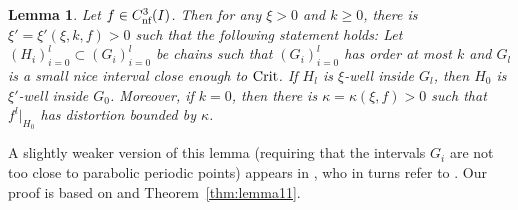 \documentclass[12pt, psamsfonts, reqno]{amsart}
\newtheorem{lemma}[theorem]{Lemma}
\begin{document}
\begin{lemma} \label{lem:boundedorder}
 Let $f\in {C^3_{\text{\rm nf}}}(I)$. Then for any $\xi>0$
 and $k\geq 0$, there is $\xi'=\xi'(\xi,k,f)>0$  such that the following statement
 holds: Let $(H_i)_{i=0}^l\subset
 (G_i)_{i=0}^l$ be chains such that $(G_i)_{i=0}^l$ has order at most $k$ and $G_l$
 is a small nice interval close enough to ${\mathop{\rm Crit}\nolimits}$. If $H_l$ is $\xi$-well inside
 $G_l$, then $H_0$ is $\xi'$-well inside $G_0$. Moreover, if $k=0$, then there
 is $\kappa = \kappa(\xi, f)>0$ such that $f^l|_{H_0}$ has distortion bounded
 by $\kappa$.
\end{lemma}

A slightly weaker version of this lemma (requiring that the
intervals $G_i$ are not too close to parabolic periodic points)
appears in \cite{LS}, who in turns refer to
\cite[Theorem~C(2)]{vSV}. Our proof is based on
\cite[Proposition~3]{vSV} and Theorem~\ref{thm:lemma11}.
\end{document}
